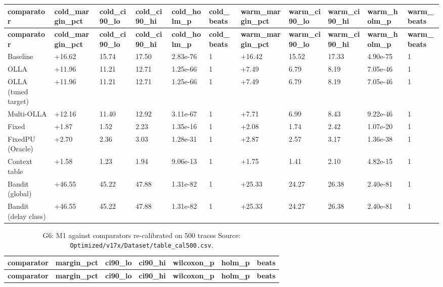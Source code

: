 \documentclass[10pt]{article}
\begin{document}
\begin{landscape}
\begin{longtable}{@{}lllllllllll@{}}
\textbf{comparator} & \textbf{cold\_margin\_pct} & \textbf{cold\_ci90\_lo} & \textbf{cold\_ci90\_hi} & \textbf{cold\_holm\_p} & \textbf{cold\_beats} & \textbf{warm\_margin\_pct} & \textbf{warm\_ci90\_lo} & \textbf{warm\_ci90\_hi} & \textbf{warm\_holm\_p} & \textbf{warm\_beats} \\
\midrule
\endfirsthead
\toprule
\textbf{comparator} & \textbf{cold\_margin\_pct} & \textbf{cold\_ci90\_lo} & \textbf{cold\_ci90\_hi} & \textbf{cold\_holm\_p} & \textbf{cold\_beats} & \textbf{warm\_margin\_pct} & \textbf{warm\_ci90\_lo} & \textbf{warm\_ci90\_hi} & \textbf{warm\_holm\_p} & \textbf{warm\_beats} \\
\midrule
\endhead
Baseline & +16.62 & 15.74 & 17.50 & 2.83e-76 & 1 & +16.42 & 15.52 & 17.33 & 4.90e-75 & 1 \\
OLLA & +11.96 & 11.21 & 12.71 & 1.25e-66 & 1 & +7.49 & 6.79 & 8.19 & 7.05e-46 & 1 \\
OLLA (tuned target) & +11.96 & 11.21 & 12.71 & 1.25e-66 & 1 & +7.49 & 6.79 & 8.19 & 7.05e-46 & 1 \\
Multi-OLLA & +12.16 & 11.40 & 12.92 & 3.11e-67 & 1 & +7.71 & 6.99 & 8.43 & 9.22e-46 & 1 \\
Fixed & +1.87 & 1.52 & 2.23 & 1.35e-16 & 1 & +2.08 & 1.74 & 2.42 & 1.07e-20 & 1 \\
FixedPU (Oracle) & +2.70 & 2.36 & 3.03 & 1.28e-31 & 1 & +2.87 & 2.57 & 3.17 & 1.36e-38 & 1 \\
Context table & +1.58 & 1.23 & 1.94 & 9.06e-13 & 1 & +1.75 & 1.41 & 2.10 & 4.82e-15 & 1 \\
Bandit (global) & +46.55 & 45.22 & 47.88 & 1.31e-82 & 1 & +25.33 & 24.27 & 26.38 & 2.40e-81 & 1 \\
Bandit (delay class) & +46.55 & 45.22 & 47.88 & 1.31e-82 & 1 & +25.33 & 24.27 & 26.38 & 2.40e-81 & 1 \\
\bottomrule
\end{longtable}
\normalsize
\tiny
\setlength{\tabcolsep}{2pt}
\begin{longtable}{@{}lllllll@{}}
\caption{G6: M1 against comparators re-calibrated on 500 traces Source: \texttt{Optimized/v17x/Dataset/table\_cal500.csv}.}\\
\toprule
\textbf{comparator} & \textbf{margin\_pct} & \textbf{ci90\_lo} & \textbf{ci90\_hi} & \textbf{wilcoxon\_p} & \textbf{holm\_p} & \textbf{beats} \\
\midrule
\endfirsthead
\toprule
\textbf{comparator} & \textbf{margin\_pct} & \textbf{ci90\_lo} & \textbf{ci90\_hi} & \textbf{wilcoxon\_p} & \textbf{holm\_p} & \textbf{beats} \\

\end{longtable}
\end{landscape}
\end{document}
